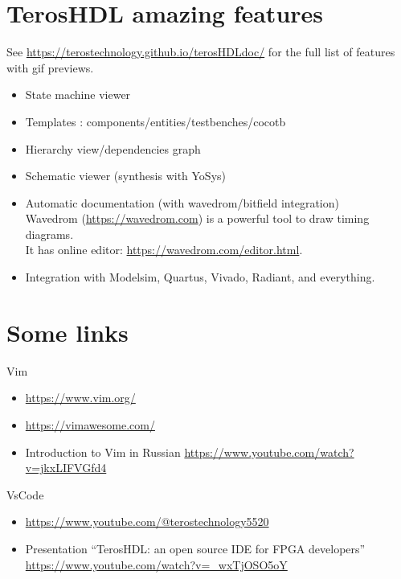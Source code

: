 \documentclass[aspectratio=169]{beamer}
\newcommand{\myurl}[1]{{\color{indigo}\url{#1}}}%
\begin{document}
\section*{TerosHDL amazing features}
\begin{frame}{\secname}

  See \myurl{https://terostechnology.github.io/terosHDLdoc/} for the full list of features
  with gif previews.

  \begin{itemize}
    \item State machine viewer
    \item Templates : components/entities/testbenches/cocotb
    \item Hierarchy view/dependencies graph
    \item Schematic viewer (synthesis with YoSys)
    \item Automatic documentation (with wavedrom/bitfield integration) \\
      Wavedrom (\myurl{https://wavedrom.com}) is a powerful tool to draw timing diagrams.\\
      It has online editor: \myurl{https://wavedrom.com/editor.html}.
    \item Integration with Modelsim, Quartus, Vivado, Radiant, and everything.
  \end{itemize}
    
\end{frame}

\section*{Some links}
\begin{frame}{\secname}
  \begin{block}{Vim}
    \begin{itemize}
      \item \myurl{https://www.vim.org/}
      \item \myurl{https://vimawesome.com/}
      \item Introduction to Vim in Russian \myurl{https://www.youtube.com/watch?v=jkxLIFVGfd4}
    \end{itemize}
  \end{block}

  \begin{block}{VsCode}
    \begin{itemize}
      \item \myurl{https://www.youtube.com/@terostechnology5520}
      \item Presentation ``TerosHDL: an open source IDE for FPGA developers'' \myurl{https://www.youtube.com/watch?v=_wxTjOSO5oY}
    \end{itemize}
  \end{block}
  	
\end{frame}
\end{document}
